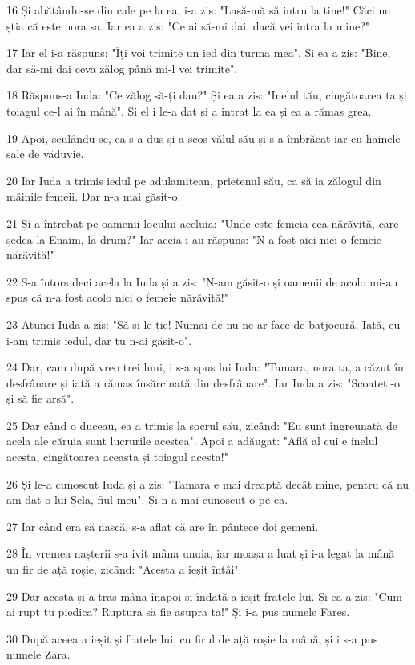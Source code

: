 \par 16 Și abătându-se din cale pe la ea, i-a zis: "Lasă-mă să intru la tine!" Căci nu știa că este nora sa. Iar ea a zis: "Ce ai să-mi dai, dacă vei intra la mine?"
\par 17 Iar el i-a răspuns: "Îți voi trimite un ied din turma mea". Și ea a zis: "Bine, dar să-mi dai ceva zălog până mi-l vei trimite".
\par 18 Răspuns-a Iuda: "Ce zălog să-ți dau?" Și ea a zis: "Inelul tău, cingătoarea ta și toiagul ce-l ai în mână". Și el i le-a dat și a intrat la ea și ea a rămas grea.
\par 19 Apoi, sculându-se, ea s-a dus și-a scos vălul său și s-a îmbrăcat iar cu hainele sale de văduvie.
\par 20 Iar Iuda a trimis iedul pe adulamitean, prietenul său, ca să ia zălogul din mâinile femeii. Dar n-a mai găsit-o.
\par 21 Și a întrebat pe oamenii locului aceluia: "Unde este femeia cea nărăvită, care ședea la Enaim, la drum?" Iar aceia i-au răspuns: "N-a fost aici nici o femeie nărăvită!"
\par 22 S-a întors deci acela la Iuda și a zis: "N-am găsit-o și oamenii de acolo mi-au spus că n-a fost acolo nici o femeie nărăvită!"
\par 23 Atunci Iuda a zis: "Să și le ție! Numai de nu ne-ar face de batjocură. Iată, eu i-am trimis iedul, dar tu n-ai găsit-o".
\par 24 Dar, cam după vreo trei luni, i s-a spus lui Iuda: "Tamara, nora ta, a căzut în desfrânare și iată a rămas însărcinată din desfrânare". Iar Iuda a zis: "Scoateți-o și să fie arsă".
\par 25 Dar când o duceau, ea a trimis la socrul său, zicând: "Eu sunt îngreunată de acela ale căruia sunt lucrurile acestea". Apoi a adăugat: "Află al cui e inelul acesta, cingătoarea aceasta și toiagul acesta!"
\par 26 Și le-a cunoscut Iuda și a zis: "Tamara e mai dreaptă decât mine, pentru că nu am dat-o lui Șela, fiul meu". Și n-a mai cunoscut-o pe ea.
\par 27 Iar când era să nască, s-a aflat că are în pântece doi gemeni.
\par 28 În vremea nașterii s-a ivit mâna unuia, iar moașa a luat și i-a legat la mână un fir de ață roșie, zicând: "Acesta a ieșit întâi".
\par 29 Dar acesta și-a tras mâna înapoi și îndată a ieșit fratele lui. Și ea a zis: "Cum ai rupt tu piedica? Ruptura să fie asupra ta!" Și i-a pus numele Fares.
\par 30 După aceea a ieșit și fratele lui, cu firul de ață roșie la mână, și i s-a pus numele Zara.

